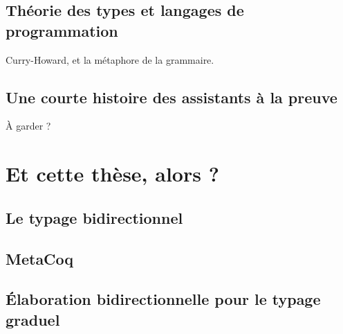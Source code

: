 \subsection{Théorie des types et langages de programmation}

Curry-Howard, et la métaphore de la grammaire.

\subsection{Une courte histoire des assistants à la preuve}

À garder ?

\section{Et cette thèse, alors ?}

\subsection{Le typage bidirectionnel}

\subsection{MetaCoq}

\subsection{Élaboration bidirectionnelle pour le typage graduel}
